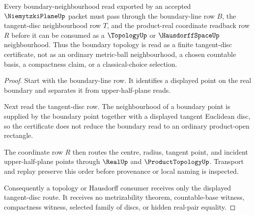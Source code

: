\begin{theorem}
\label{thm:niemytzki-plane-tangent-disc-boundary-route}
Every boundary-neighbourhood read exported by an accepted $\NiemytzkiPlaneUp$ packet must pass through the boundary-line row $B$, the tangent-disc neighbourhood row $T$, and the product-real coordinate readback row $R$ before it can be consumed as a $\TopologyUp$ or $\HausdorffSpaceUp$ neighbourhood. Thus the boundary topology is read as a finite tangent-disc certificate, not as an ordinary metric-ball neighbourhood, a chosen countable basis, a compactness claim, or a classical-choice selection.
\end{theorem}
\begin{proof}
Start with the boundary-line row. It identifies a displayed point on the real boundary and separates it from upper-half-plane reads.

Next read the tangent-disc row. The neighbourhood of a boundary point is supplied by the boundary point together with a displayed tangent Euclidean disc, so the certificate does not reduce the boundary read to an ordinary product-open rectangle.

The coordinate row $R$ then routes the centre, radius, tangent point, and incident upper-half-plane points through $\RealUp$ and $\ProductTopologyUp$. Transport and replay preserve this order before provenance or local naming is inspected.

Consequently a topology or Hausdorff consumer receives only the displayed tangent-disc route. It receives no metrizability theorem, countable-base witness, compactness witness, selected family of discs, or hidden real-pair equality.
\end{proof}





